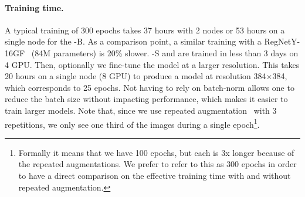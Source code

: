 \paragraph{Training time. }

A typical training of 300 epochs takes 37 hours with 2 nodes or 53 hours on a single node for the \ours-B.%
As a comparison point, a similar training with a RegNetY-16GF~\cite{Radosavovic2020RegNet} (84M parameters) is 20\% slower.
\ours-S and \ourstiny are trained in less than 3 days on 4 GPU.
Then, optionally we fine-tune the model at a larger resolution. This takes 20 hours on a single node (8 GPU) to produce a \oursfix model at resolution 384$\times$384, which corresponds to 25 epochs.
% 
Not having to rely on batch-norm allows one to reduce the batch size without impacting performance, which makes it easier to train larger models.
% 
% 
Note that, since we use repeated augmentation~\cite{berman2019multigrain,hoffer2020augment} with 3 repetitions, we only see one third of the images during a single epoch\footnote{Formally it means that we have 100 epochs, but each is 3x longer because of the repeated augmentations. We prefer to refer to this as 300 epochs in order to have a direct comparison on the effective training time with and without repeated augmentation.}.




